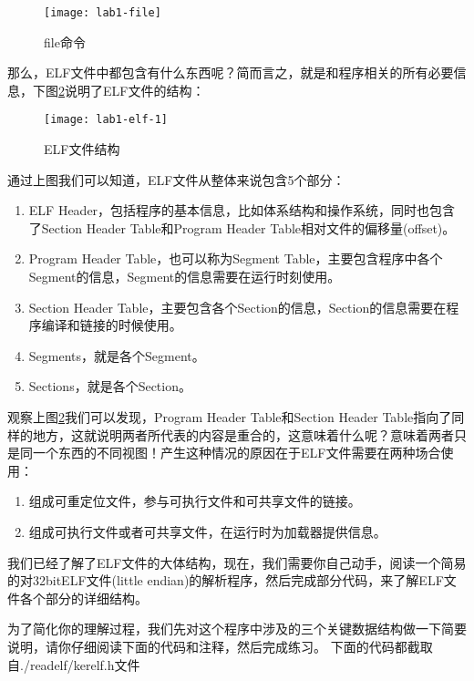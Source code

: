 \begin{figure}[htbp]
  \centering
  \texttt{[image: lab1-file]}
  \caption{file命令}\label{fig:lab1-file} 
\end{figure}

那么，ELF文件中都包含有什么东西呢？简而言之，就是和程序相关的所有必要信息，下图\ref{fig:lab1-elf-1}说明了ELF文件的结构：

\begin{figure}[htbp]
  \centering
  \texttt{[image: lab1-elf-1]}
  \caption{ELF文件结构}\label{fig:lab1-elf-1}
\end{figure}

通过上图我们可以知道，ELF文件从整体来说包含5个部分：

\begin{enumerate}
  \item ELF Header，包括程序的基本信息，比如体系结构和操作系统，同时也包含了Section Header Table和Program Header Table相对文件的偏移量(offset)。
  \item Program Header Table，也可以称为Segment Table，主要包含程序中各个Segment的信息，Segment的信息需要在运行时刻使用。
  \item Section Header Table，主要包含各个Section的信息，Section的信息需要在程序编译和链接的时候使用。
  \item Segments，就是各个Segment。
  \item Sections，就是各个Section。
\end{enumerate}

观察上图\ref{fig:lab1-elf-1}我们可以发现，Program Header Table和Section Header Table指向了同样的地方，这就说明两者所代表的内容是重合的，这意味着什么呢？意味着两者只是同一个东西的不同视图！产生这种情况的原因在于ELF文件需要在两种场合使用：

  \begin{enumerate}
    \item 组成可重定位文件，参与可执行文件和可共享文件的链接。
    \item 组成可执行文件或者可共享文件，在运行时为加载器提供信息。
  \end{enumerate}

我们已经了解了ELF文件的大体结构，现在，我们需要你自己动手，阅读一个简易的对32bitELF文件(little endian)的解析程序，然后完成部分代码，来了解ELF文件各个部分的详细结构。

为了简化你的理解过程，我们先对这个程序中涉及的三个关键数据结构做一下简要说明，请你仔细阅读下面的代码和注释，然后完成练习。
下面的代码都截取自./readelf/kerelf.h文件

